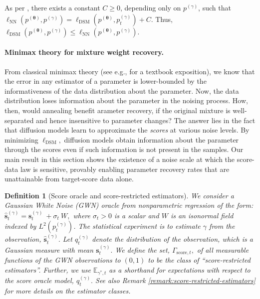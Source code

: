 \documentclass[11pt]{article}
\newcommand{\vect}[1]{\mathbf{#1}}
\theoremstyle{plain}
\newtheorem{definition}[theorem]{Definition}
\newcommand{\1}{\mathbbm{1}}
\newcommand{\btheta}{{\boldsymbol{\theta}}}
\newcommand{\ldsm}{\ell_\mathrm{DSM}}
\newcommand{\lnn}{\ell_{\mathrm{NN}}}
\newcommand{\pdist}[2][]{p_{#1}^{(#2)}}
\newcommand{\qdist}[2][]{q_{#1}^{(#2)}}
\newcommand{\score}[2][]{\vect{s}_{#1}^{(#2)}}
\begin{document}
As per , there exists a constant $C\geq 0$, depending only on $\pdist{\gamma}$, such that $\lnn(\pdist{\btheta}, \pdist{\gamma})=\ldsm(\pdist{\btheta}, \pdist[t]{\gamma}) + C$. %
Thus, %
$\ldsm(\pdist{\btheta}, \pdist{\gamma}) \leq \lnn(\pdist{\btheta}, \pdist{\gamma})$.

\paragraph{Minimax theory for mixture weight recovery.} From classical minimax theory (see e.g., \citep{geer2000empirical} for a textbook exposition), we know that the error in any estimator of a parameter is lower-bounded by the informativeness of the data distribution about the parameter. Now, the data distribution loses information about the parameter in the noising process. How, then, would annealing benefit  arameter recovery, if the original mixture is well-separated and hence insensitive to parameter changes? The answer lies in the fact that diffusion models learn to approximate the \emph{scores} at various noise levels. By minimizing $\ldsm,$ diffusion models obtain information about the parameter through the scores even if such information is not present in the samples.  Our main result in this section shows the existence of a noise scale at which the score-data law is sensitive, provably enabling parameter recovery rates that are unattainable from target-score data alone.


\begin{definition}[Score oracle and score-restricted estimators] We consider a Gaussian White Noise (GWN) oracle from nonparametric regression \cite{tsybakov2008nonparametric} of the form: $\hat{\mathbf s}_{t}^{(\gamma)} = \score[t]{\gamma}\:  + \sigma_t \: W,$ where $\sigma_t > 0$ is a scalar and $W$ is an isonormal field indexed by $L^2(\pdist[t]{\gamma})$. The statistical experiment is to estimate $\gamma$ from the observation, $\hat{\mathbf s}^{(\gamma)}_t.$ Let $\qdist[t]{\gamma}$ denote the distribution of the observation, which is a Gaussian measure with mean $\score[t]{\gamma}.$ We define the set, $\Gamma_{\mathrm{score},t},$ of all measurable functions of the GWN observations to $(0,1)$ to be the class of ``score-restricted estimators''.  Further, we use $ \mathbb{E}_{\gamma^*,t}$ as a shorthand for expectations with respect to the score oracle model, $\qdist[t]{\gamma}.$ See also Remark \ref{remark:score-restricted-estimators} for more details on the estimator classes.
\label{def:scoreEstimator}
\end{definition}
\end{document}

